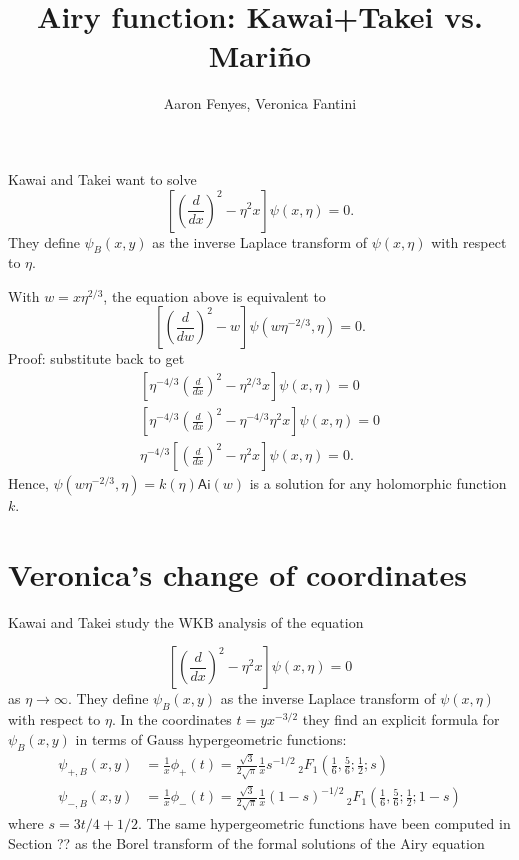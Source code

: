 \documentclass{article}
\title{Airy function: Kawai+Takei vs. Mari\~{n}o}
\author{Aaron Fenyes, Veronica Fantini}
\theoremstyle{definition}
\theoremstyle{plain}
\begin{document}
\maketitle
Kawai and Takei want to solve
\[ \left[\left(\frac{d}{dx}\right)^2 - \eta^2 x \right] \psi(x, \eta) = 0. \]
They define $\psi_B(x, y)$ as the inverse Laplace transform of $\psi(x, \eta)$ with respect to $\eta$.

With $w = x \eta^{2/3}$, the equation above is equivalent to
\[ \left[\left(\frac{d}{dw}\right)^2 - w \right] \psi(w \eta^{-2/3}, \eta) = 0. \]
Proof: substitute back to get
\begin{align*}
\left[\eta^{-4/3} \left(\frac{d}{dx}\right)^2 - \eta^{2/3} x\right] \psi(x, \eta) = 0 \\
\left[\eta^{-4/3} \left(\frac{d}{dx}\right)^2 - \eta^{-4/3}\eta^2 x \right] \psi(x, \eta) = 0 \\
\eta^{-4/3} \left[\left(\frac{d}{dx}\right)^2 - \eta^2 x\right] \psi(x, \eta) = 0.
\end{align*}
Hence, $\psi(w \eta^{-2/3}, \eta) = k(\eta) \mathsf{Ai}(w)$ is a solution for any holomorphic function $k$.


\section{Veronica's change of coordinates}

Kawai and Takei study the WKB analysis of the equation

\begin{equation}
\label{WKB_Airy} 
\left[\left(\frac{d}{dx}\right)^2 - \eta^2 x \right] \psi(x, \eta) = 0 
\end{equation}
as $\eta\to\infty$. They define $\psi_B(x, y)$ as the inverse Laplace transform of $\psi(x, \eta)$ with respect to $\eta$. In the coordinates $t=yx^{-3/2}$ they find an explicit formula for $\psi_B(x,y)$ in terms of Gauss hypergeometric functions:
\begin{align*}
\psi_{+,B}(x,y)&=\frac{1}{x}\phi_+(t)=\frac{\sqrt{3}}{2\sqrt{\pi}}\frac{1}{x}s^{-1/2}\, {}_2F_1\left(\frac{1}{6},\frac{5}{6};\frac{1}{2};s\right)\\
\psi_{-,B}(x,y)&=\frac{1}{x}\phi_-(t)=\frac{\sqrt{3}}{2\sqrt{\pi}}\frac{1}{x}(1-s)^{-1/2}\, {}_2F_1\left(\frac{1}{6},\frac{5}{6};\frac{1}{2};1-s\right)
\end{align*}
where $s=3t/4+1/2$. 
The same hypergeometric functions have been computed in Section ?? as the Borel transform of the formal solutions of the Airy equation
\end{document}

